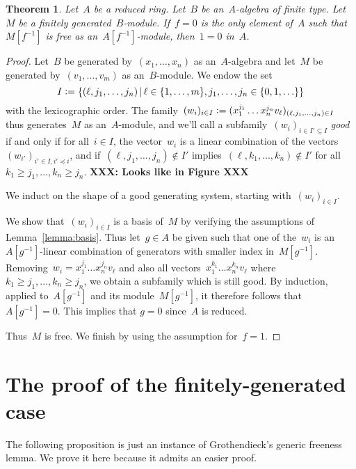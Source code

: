 \documentclass{amsart}
\theoremstyle{definition}
\theoremstyle{plain}
\newtheorem{thm}[defn]{Theorem}
\theoremstyle{remark}
\newcommand{\XXX}[1]{\textbf{XXX: #1}}
\newcommand{\defeq}{\vcentcolon=}
\begin{document}
\begin{thm}Let~$A$ be a reduced ring. Let~$B$ be an~$A$-algebra of finite type.
Let~$M$ be a finitely generated~$B$-module. If~$f = 0$ is the only element
of~$A$ such that~$M[f^{-1}]$ is free as an~$A[f^{-1}]$-module, then~$1 = 0$
in~$A$.\end{thm}

\begin{proof}Let~$B$ be generated by~$(x_1,\ldots,x_n)$ as an~$A$-algebra and
let~$M$ be generated by~$(v_1,\ldots,v_m)$ as an~$B$-module. We endow the set
\[ I \defeq \{ (\ell, j_1,\ldots,j_n) \,|\,
  \ell \in \{ 1,\ldots,m \},
  j_1,\ldots,j_n \in \{ 0,1,\ldots \} \} \]
with the lexicographic order. The family~$(w_i)_{i \in I} \defeq (x_1^{j_1}
\ldots x_n^{j_n} v_\ell)_{(\ell,j_1,\ldots,j_n) \in I}$ thus generates~$M$ as
an~$A$-module, and we'll call a subfamily~$(w_i)_{i \in I' \subseteq I}$
\emph{good} if and only if for all~$i \in I$, the vector~$w_i$ is a linear
combination of the vectors~$(w_{i'})_{i' \in I, i' \preceq i}$,
and if~$(\ell,j_1,\ldots,j_n) \not\in I'$ implies~$(\ell,k_1,\ldots,k_n) \not\in
I'$ for all~$k_1 \geq j_1, \ldots, k_n \geq j_n$. \XXX{Looks like in Figure XXX}

We induct on the shape of a good generating system, starting with~$(w_i)_{i \in I}$.

We show that~$(w_i)_{i \in I}$ is a basis of~$M$ by verifying the assumptions
of Lemma~\ref{lemma:basis}. Thus let~$g \in A$ be given such that one of
the~$w_i$ is an $A[g^{-1}]$-linear combination of generators with smaller index
in~$M[g^{-1}]$. Removing~$w_i = x_1^{j_1} \ldots x_n^{j_n} v_\ell$ and also all
vectors~$x_1^{k_1} \ldots x_n^{k_n} v_\ell$ where~$k_1 \geq j_1, \ldots, k_n
\geq j_n$, we obtain a subfamily which is still good. By induction, applied
to~$A[g^{-1}]$ and its module~$M[g^{-1}]$, it therefore follows that $A[g^{-1}] = 0$.
This implies that $g = 0$ since~$A$ is reduced.

Thus~$M$ is free. We finish by using the assumption for~$f = 1$.
\end{proof}


\section{The proof of the finitely-generated case}

The following proposition is just an instance of Grothendieck's generic
freeness lemma. We prove it here because it admits an easier proof.
\end{document}
